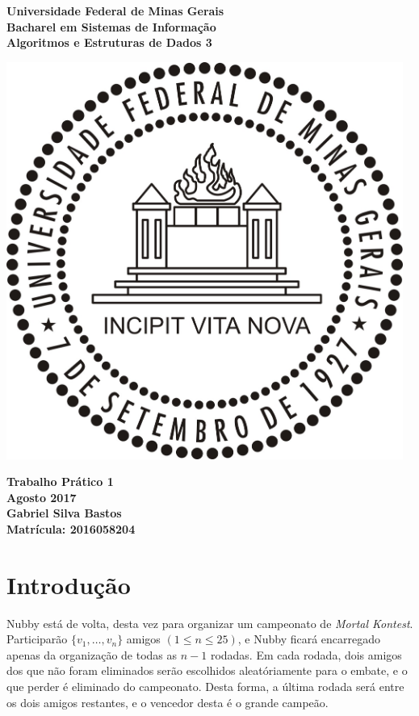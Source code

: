 \documentclass{article}
\begin{document}
\begin{titlepage}
  \centering
  
  \vfill{
    \bfseries\Huge
    Universidade Federal de Minas Gerais\\[5pt]
    \bfseries\Large
    Bacharel em Sistemas de Informação \\
    Algoritmos e Estruturas de Dados 3\\
  }
  
  \vfill
  
  \includegraphics[width=13cm]{images/ufmg_logo.jpg}
  
  \vfill{
    \bfseries\Large
    Trabalho Prático 1\\
    Agosto 2017\\
  }
  \vfill{
    \bfseries\large
    Gabriel Silva Bastos\\[5pt]
    Matrícula: 2016058204
  }
\end{titlepage}


\section{Introdução}
Nubby está de volta, desta vez para organizar um campeonato de \textit{Mortal Kontest}. Participarão $\{ v_1, \hdots, v_n \}$ amigos $(1 \leq n \leq 25)$, e Nubby ficará encarregado apenas da organização de todas as $n - 1$ rodadas. Em cada rodada, dois amigos dos que não foram eliminados serão escolhidos aleatóriamente para o embate, e o que perder é eliminado do campeonato. Desta forma, a última rodada será entre os dois amigos restantes, e o vencedor desta é o grande campeão.
\end{document}
